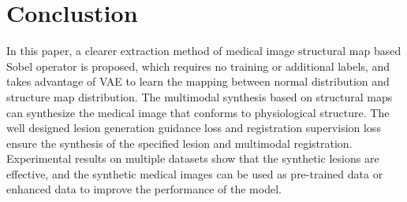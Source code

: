 \documentclass[runningheads]{llncs}
\begin{document}
	\section{Conclustion}
	In this paper, a clearer extraction method of medical image structural map based Sobel operator is proposed, which requires no training or additional labels, and takes advantage of VAE to learn the mapping between normal distribution and structure map distribution. The multimodal synthesis based on structural maps can synthesize the medical image that conforms to physiological structure. The well designed lesion generation guidance loss and registration supervision loss ensure the synthesis of the specified lesion and multimodal registration. Experimental results on multiple datasets show that the synthetic lesions are effective, and the synthetic medical images can be used as pre-trained data or enhanced data to improve the performance of the model.
	
		
\end{document}
